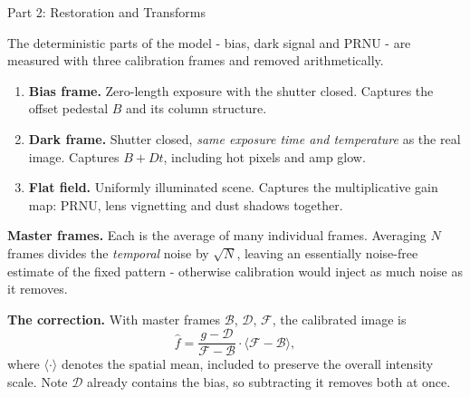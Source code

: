 \documentclass[letterpaper]{article}
\begin{document}
\begin{notes}{Part 2: Restoration and Transforms}
\begin{center}
\end{center}


The deterministic parts of the model - bias, dark signal and PRNU - are measured with three calibration frames and removed arithmetically.

\begin{enumerate}
    \item \textbf{Bias frame.} Zero-length exposure with the shutter closed. Captures the offset pedestal $B$ and its column structure.
    \item \textbf{Dark frame.} Shutter closed, \emph{same exposure time and temperature} as the real image. Captures $B + Dt$, including hot pixels and amp glow.
    \item \textbf{Flat field.} Uniformly illuminated scene. Captures the multiplicative gain map: PRNU, lens vignetting and dust shadows together.
\end{enumerate}

\textbf{Master frames.} Each is the average of many individual frames. Averaging $N$ frames divides the \emph{temporal} noise by $\sqrt N$, leaving an essentially noise-free estimate of the fixed pattern - otherwise calibration would inject as much noise as it removes.

\textbf{The correction.} With master frames $\mathcal{B}$, $\mathcal{D}$, $\mathcal{F}$, the calibrated image is
$$\hat f = \frac{g - \mathcal{D}}{\mathcal{F} - \mathcal{B}}\cdot\bigl\langle \mathcal{F} - \mathcal{B}\bigr\rangle,$$
where $\langle\cdot\rangle$ denotes the spatial mean, included to preserve the overall intensity scale. Note $\mathcal{D}$ already contains the bias, so subtracting it removes both at once.


\end{notes}
\end{document}
